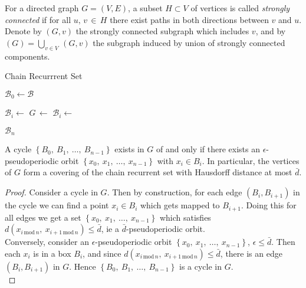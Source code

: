 \begin{definition}
    For a directed graph $G = (V, E)$, a subset $H \subset V$ of vertices is called 
    \emph{strongly connected} if for all $u,\, v\, \in\, H$ there exist paths in both 
    directions between $v$ and $u$. Denote by $(G, v)$ the strongly connected
    subgraph which includes $v$, and by 
    $(G) = \bigcup_{v \in V}\,$$(G, v)$ 
    the subgraph induced by union of strongly connected components.
\end{definition}

\begin{algorithm}
    \caption{Chain Recurrrent Set}
    \label{alg:chain}

    \begin{algorithmic}[1]
        \State $\mathcal{B}_0 \gets \mathcal{B}$

            \State $\mathcal{B}_i \gets$ 
            \State $G\, \gets$ 
            \State $\mathcal{B}_i \gets$ 
        \EndFor

        \State \Return $\mathcal{B}_n$
    \end{algorithmic}
\end{algorithm}

\begin{proposition}
    A cycle $\left\{ B_0,\ B_1,\ \ldots,\ B_{n-1} \right\}$ exists in $G$
    of and only if there exists an $\epsilon$-pseudoperiodic orbit 
    $\left\{ x_0,\ x_1,\ \ldots,\ x_{n-1} \right\}$ with $x_i \in B_i$.
    In particular, the vertices of $G$ form a covering of the chain recurrent set with 
    Hausdorff distance at most $\bar{d}$.
\end{proposition}

\begin{proof}
    Consider a cycle in $G$. Then by construction, for each edge $(B_i, B_{i+1})$ in the 
    cycle we can find a point $x_i \in B_i$ which gets mapped to $B_{i+1}$. Doing this for all
    edges we get a set $\left\{ x_0,\ x_1,\ \ldots,\ x_{n-1} \right\}$ which satisfies 
    $d(x_{i\, \text{mod}\, n},\ x_{i+1\, \text{mod}\, n}) \leq \bar{d}$, ie a 
    $\bar{d}$-pseudoperiodic orbit. \\

    Conversely, consider an $\epsilon$-pseudoperiodic orbit 
    $\left\{ x_0,\ x_1,\ \ldots,\ x_{n-1} \right\}$, $\epsilon \leq \bar{d}$. Then each $x_i$ is in
    a box $B_i$, and since $d(x_{i\, \text{mod}\, n},\ x_{i+1\, \text{mod}\, n}) \leq \bar{d}$, 
    there is an edge $(B_i, B_{i+1})$ in $G$. Hence 
    $\left\{ B_0,\ B_1,\ \ldots,\ B_{n-1} \right\}$ is a cycle in $G$. \\
\end{proof}

